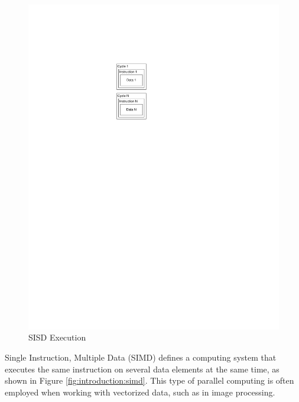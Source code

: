 \begin{figure}[ptb]
	\begin{centering}
		\includegraphics{Introduction/Figures/introduction-sisd.pdf}
		\caption{SISD Execution}
		\label{fig:introduction:sisd}
	\end{centering}
\end{figure}

Single Instruction, Multiple Data (SIMD) defines a computing system that executes the same instruction on several data elements at the same time, as shown in Figure \ref{fig:introduction:simd}.  This type of parallel computing is often employed when working with vectorized data, such as in image processing.

